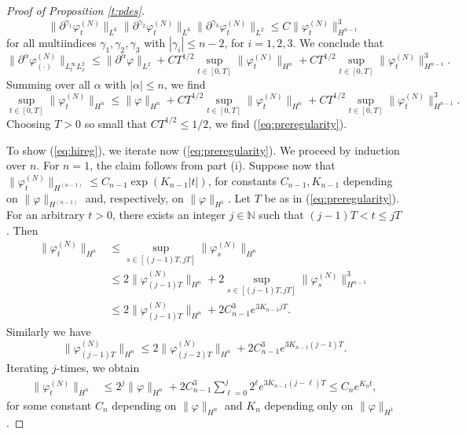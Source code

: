 \documentclass[11pt,a4paper]{article}
\newcommand{\done}{}
\newcommand{\bN}{{\mathbb N}}
\begin{document}
\begin{proof}[Proof of Proposition \ref{t:pdes}]
\[  \| \partial^{\gamma_1} \varphi_t^{(N)} \|_{L^6} \| \partial^{\gamma_2} \varphi_t^{(N)} \|_{L^6} \| \partial^{\gamma_3} \varphi_t^{(N)} \|_{L^2} \leq C \| \varphi_t^{(N)} \|_{H^{n-1}}^3 \]
for all multiindices $\gamma_1, \gamma_2, \gamma_3$ with $|\gamma_i| \leq n-2$, for $i=1,2,3$. We conclude that
\[ \| \partial^\alpha \varphi^{(N)}_{(\cdot)} \|_{L_t^\infty L_x^2} \leq  \|
    \partial^\alpha \varphi \|_{L^2} + C T^{1/2} \sup_{t \in [0,T]} \| \varphi_t^{(N)} \|_{H^n} + C T^{1/2} \sup_{t \in [0,T]} \| \varphi_t^{(N)} \|_{H^{n-1}}^3. \]   
Summing over all $\alpha$ with $|\alpha| \leq n$, we find
\[ \sup_{t \in [0,T]} \| \varphi^{(N)}_{t} \|_{H^n} \leq  \| \varphi \|_{H^n} + C T^{1/2} \sup_{t \in [0,T]} \| \varphi_t^{(N)} \|_{H^n} + C T^{1/2} \sup_{t \in [0,T]} \| \varphi_t^{(N)} \|_{H^{n-1}}^3. \]  
Choosing $T > 0$ so small that $CT^{1/2} \leq 1/2$, we find (\ref{eq:preregularity}).

To show (\ref{eq:hireg}), we iterate now (\ref{eq:preregularity}). We proceed by induction over $n$. For $n =1$, the claim follows from part (i). Suppose now that $\| \varphi^{(N)}_t \|_{H^{(n-1)}} \leq C_{n-1} \exp (K_{n-1} |t|)$, for constants $C_{n-1}, K_{n-1}$ depending on $\| \varphi \|_{H^{(n-1)}}$ and, respectively, on $\| \varphi \|_{H^1}$. Let $T$ be as in (\ref{eq:preregularity}). For an arbitrary $t >0$, there exists an integer $j \in \bN$ such that $(j-1) T < t \leq jT$. Then
  \begin{align*}
    \| \varphi_t^{(N)} \|_{H^n} & \le \sup_{s \in [(j-1)T, jT]} \| \varphi_s^{(N)}
    \|_{H^n}\done \\
    & \le 2 \| \varphi_{(j-1)T}^{(N)} \|_{H^n} + 2\sup_{s \in [(j-1)T, jT]} \|
    \varphi_s^{(N)} \|_{H^{n-1}}^3 \\
    & \le 2 \| \varphi_{(j-1)T}^{(N)} \|_{H^n} + 2 C_{n-1}^3 e^{3 K_{n-1} j T}.
  \end{align*}
Similarly we have
  \[
    \| \varphi_{(j-1)T}^{(N)} \|_{H^n} \le 2 \|
    \varphi_{(j-2)T}^{(N)} \|_{H^n} + 2 C_{n-1}^3  e^{3 K_{n-1} (j-1)T}.\done
  \]
Iterating $j$-times, we obtain
  \begin{align*}
    \| \varphi_t^{(N)} \|_{H^n} & \le 2^j \| \varphi \|_{H^n} + 2 C_{n-1}^3
    \sum_{\ell=0}^j 2^{\ell} e^{3 K_{n-1} (j-\ell)T} \le C_n e^{K_n t},\done
  \end{align*}
  for some constant $C_n$ depending on $\| \varphi \|_{H^n}$ and $K_n$ depending only on $\| \varphi \|_{H^1}$.


\end{proof}
\end{document}
